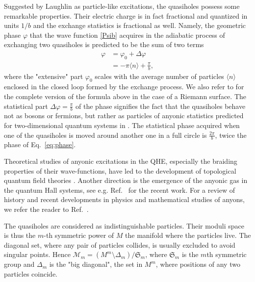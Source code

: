 \documentclass{article}
\theoremstyle{definition}
\begin{document}
Suggested by Laughlin as particle-like excitations, the quasiholes possess some remarkable  properties. Their electric charge is in fact fractional and quantized in units $1/b$ \cite{Laughlin_1983} and the exchange statistics is fractional as well. Namely, the geometric phase $\varphi$ that the wave function \eqref{Psib} acquires in the adiabatic process of exchanging two quasiholes is predicted \cite{Halperin_1984, Arovas_Schrieffer_Wilczek_1984} to be the sum of two terms
\begin{align}\label{eq:phase}\nonumber
    \varphi&=\varphi_0+\Delta\varphi\\&=
    -\pi\langle n\rangle+\frac{\pi}b,
\end{align}
where the "extensive" part $\varphi_0$ scales with the average number of particles $\langle n\rangle$ enclosed in the closed loop formed by the exchange process. We also refer to \cite[Eq.\ (E.9), App. E]{Can} for the complete version of the formula above in the case of a Riemann surface. The statistical part $\Delta\varphi=\frac{\pi}b$ of the phase signifies the fact that the quasiholes behave not as bosons or fermions, but rather as particles of anyonic statistics predicted for two-dimensional quantum systems in \cite{Leinaas_Myrheim_1977, Wilczek_Shapere_1989}. The statistical phase acquired when one of the quasiholes is moved around another one in a full circle is $\frac{2\pi}b$, twice the phase of Eq.\ \eqref{eq:phase}.

Theoretical studies of anyonic excitations in the QHE, especially the braiding properties of their wave-functions, have led to the development of topological quantum field theories \cite{Wilczek_1982,Halperin_1984,Arovas_Schrieffer_Wilczek_1984,Simon_1983,Berry_1984,Witten1989,FG1990,Moore_Read_1991,Wen_1990,Nayak_Simon_Stern_Freedman_Sarma_2008}. Another direction is the emergence of the anyonic gas in the quantum Hall systems, see e.g. Ref.\ \cite{Lundholm_Rougerie_2016} for the recent work. For a review of history and recent developments in physics and mathematical studies of anyons, we refer the reader to Ref.\ \cite{Lundholm_2023}. 

The quasiholes are considered as indistinguishable particles. Their moduli space is thus the $m$-th symmetric power of $M$ the manifold where the particles live. The diagonal set, where any pair of particles collides, is usually excluded to avoid singular points. Hence $\mathcal M_m= (M^m\setminus \Delta_m)/ \mathfrak{S}_m$, where $\mathfrak{S}_m$ is the $m$th symmetric group and $\Delta_m$ is the "big diagonal", the set in $M^m$, where positions of any two particles coincide. 
\end{document}
